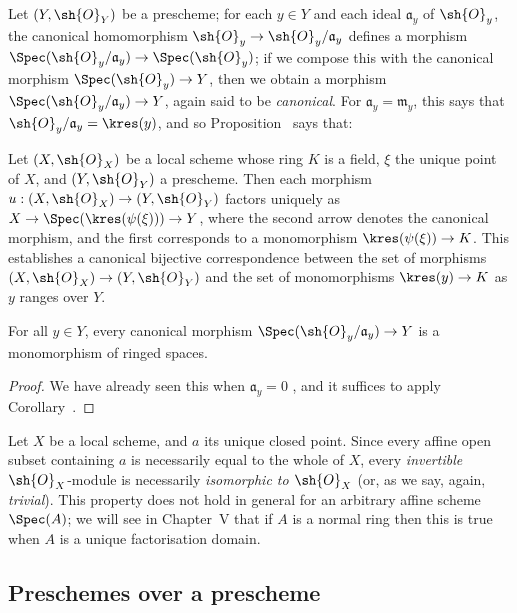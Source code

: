 Let $(Y,\sh{O}_Y)$ be a prescheme;
for each $y\in Y$ and each ideal $\mathfrak{a}_y$ of $\sh{O}_y$, the canonical homomorphism $\sh{O}_y\to\sh{O}_y/\mathfrak{a}_y$ defines a morphism $\Spec(\sh{O}_y/\mathfrak{a}_y)\to\Spec(\sh{O}_y)$;
if we compose this with the canonical morphism $\Spec(\sh{O}_y)\to Y$, then we obtain a morphism $\Spec(\sh{O}_y/\mathfrak{a}_y)\to Y$, again said to be \textit{canonical}.
For $\mathfrak{a}_y=\mathfrak{m}_y$, this says that $\sh{O}_y/\mathfrak{a}_y=\kres(y)$, and so Proposition~ says that:

\begin{corollary}[2.4.6]
\label{I.2.4.6}
Let $(X,\sh{O}_X)$ be a local scheme whose ring $K$ is a field, $\xi$ the unique point of $X$, and $(Y,\sh{O}_Y)$ a prescheme.
Then each morphism $u:(X,\sh{O}_X)\to(Y,\sh{O}_Y)$ factors uniquely as $X\to\Spec(\kres(\psi(\xi)))\to Y$, where the second arrow denotes the canonical morphism, and the first corresponds to a monomorphism $\kres(\psi(\xi))\to K$.
This establishes a canonical bijective correspondence between the set of morphisms $(X,\sh{O}_X)\to (Y,\sh{O}_Y)$ and the set of monomorphisms $\kres(y)\to K$ as $y$ ranges over $Y$.
\end{corollary}

\begin{corollary}[2.4.7]
\label{I.2.4.7}
For all $y\in Y$, every canonical morphism $\Spec(\sh{O}_y/\mathfrak{a}_y)\to Y$ is a monomorphism of ringed spaces.
\end{corollary}

\begin{proof}
We have already seen this when $\mathfrak{a}_y=0$ , and it suffices to apply Corollary~.
\end{proof}

\begin{remark}[2.4.8]
\label{I.2.4.8}
Let $X$ be a local scheme, and $a$ its unique closed point.
Since every affine open subset containing $a$ is necessarily equal to the whole of $X$, every \emph{invertible} $\sh{O}_X$-module  is necessarily \emph{isomorphic to $\sh{O}_X$} (or, as we say, again, \emph{trivial}).
This property does not hold in general for an arbitrary affine scheme $\Spec(A)$;
we will see in Chapter~V that if $A$ is a normal ring then this is true when $A$ is a unique factorisation domain.
\end{remark}

\subsection{Preschemes over a prescheme}
\label{subsection:I.2.5}


